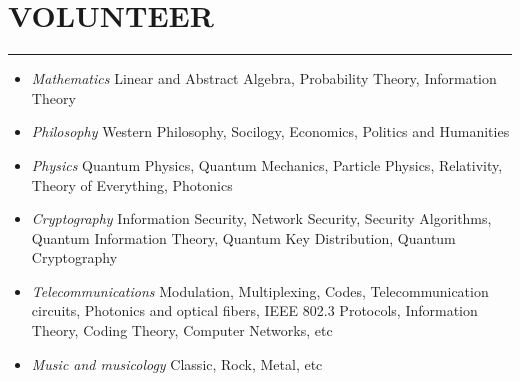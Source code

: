 \documentclass[10pt,a4paper]{article}
\begin{document}

\section{VOLUNTEER}
\noindent \rule {3.2cm}{0.4pt}
  \begin{itemize}
    \setlength{\rightskip}{2cm}
    \setlength\itemsep{0em}
    \item \small \textit{Mathematics} Linear and Abstract Algebra, Probability Theory, Information Theory
	  \item \small \textit{Philosophy} Western Philosophy, Socilogy, Economics, Politics and Humanities
	  \item \small \textit{Physics} Quantum Physics, Quantum Mechanics, Particle Physics, Relativity, Theory of Everything, Photonics 
	  \item \small \textit{Cryptography} Information Security, Network Security, Security Algorithms, Quantum Information Theory, Quantum Key Distribution, Quantum Cryptography 
	  \item \small \textit{Telecommunications} Modulation, Multiplexing, Codes, Telecommunication circuits, Photonics and optical fibers, IEEE 802.3 Protocols, Information Theory, Coding Theory, Computer Networks, etc 
    \item \small \textit{Music and musicology} Classic, Rock, Metal, etc
  \end{itemize}
\end{document}
